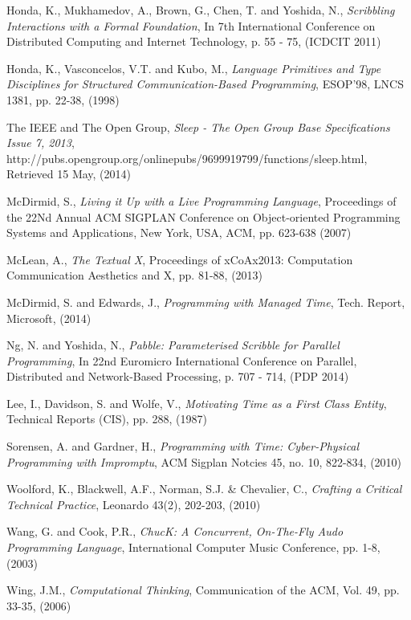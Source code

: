 \documentclass[11pt]{scrartcl}
\begin{document}
\begin{thebibliography}{9}
  Honda, K., Mukhamedov, A., Brown, G., Chen, T. and Yoshida, N.,
  \emph{Scribbling Interactions with a Formal Foundation},
  In 7th International Conference on Distributed Computing and Internet Technology,
  p. 55 - 75,
  (ICDCIT 2011)

  Honda, K., Vasconcelos, V.T. and Kubo, M.,
  \emph{Language Primitives and Type Disciplines for Structured Communication-Based Programming},
  ESOP'98, LNCS 1381,
  pp. 22-38,
  (1998)

  The IEEE and The Open Group,
  \emph{Sleep - The Open Group Base Specifications Issue 7, 2013},
  http://pubs.opengroup.org/onlinepubs/9699919799/functions/sleep.html,
  Retrieved 15 May,
  (2014)

  McDirmid, S.,
  \emph{Living it Up with a Live Programming Language},
  Proceedings of the 22Nd Annual ACM SIGPLAN Conference on Object-oriented Programming Systems and Applications,
  New York, USA,
  ACM, pp. 623-638
  (2007)

  McLean, A.,
  \emph{The Textual X},
  Proceedings of xCoAx2013: Computation Communication Aesthetics and X,
  pp. 81-88,
  (2013)

  McDirmid, S. and Edwards, J.,
  \emph{Programming with Managed Time},
  Tech. Report, Microsoft,
  (2014)

  Ng, N. and Yoshida, N.,
  \emph{Pabble: Parameterised Scribble for Parallel Programming},
  In 22nd Euromicro International Conference on Parallel, Distributed and Network-Based Processing, 
  p. 707 - 714,
  (PDP 2014)

  Lee, I., Davidson, S. and Wolfe, V.,
  \emph{Motivating Time as a First Class Entity},
  Technical Reports (CIS),
  pp. 288,
  (1987)

  Sorensen, A. and Gardner, H.,
  \emph{Programming with Time: Cyber-Physical Programming with Impromptu},
  ACM Sigplan Notcies 45,
  no. 10, 822-834,
  (2010)

  Woolford, K., Blackwell, A.F., Norman, S.J. \& Chevalier, C.,
  \emph{Crafting a Critical Technical Practice},
  Leonardo 43(2),
  202-203,
  (2010)

  Wang, G. and Cook, P.R.,
  \emph{ChucK: A Concurrent, On-The-Fly Audo Programming Language},
  International Computer Music Conference,
  pp. 1-8,
  (2003)

  Wing, J.M.,
  \emph{Computational Thinking},
  Communication of the ACM,
  Vol. 49, pp. 33-35,
  (2006)

\end{thebibliography}
\end{document}
